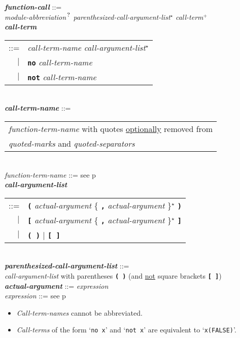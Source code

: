 \documentclass[12pt]{article}
\newcommand{\TT}[1]{{\tt \bfseries #1}}
\newcommand{\ttkey}[1]{{\tt \bfseries #1}}
\newcommand{\emkey}[1]{{\em \bfseries #1}}
\newcommand{\pagref}[1]{p\pageref{#1}}
\newcommand{\STAR}{{\Large $^\star$}}
\newcommand{\PLUS}[1][]{{$^{+#1}$}}
\newcommand{\QMARK}{{$^{\,\mbox{\footnotesize ?}}$}}
\newenvironment{indpar}[1][0.3in]%
	{\begin{list}{}%
		     {\setlength{\itemsep}{0in}%
		      \setlength{\topsep}{0in}%
		      \setlength{\parsep}{1ex}%
		      \setlength{\labelwidth}{#1}%
		      \setlength{\leftmargin}{#1}%
		      \addtolength{\leftmargin}{\labelsep}}%
	 \item}%
	{\end{list}}
\begin{document}
\begin{indpar}
\emkey{function-call}\label{FUNCTION-CALL} ::= \\
\hspace*{0.5in}
        {\em module-abbreviation}\QMARK{}
        {\em parenthesized-call-argument-list}\STAR{}
        {\em call-term}\PLUS{}
\\[0.5ex]
\emkey{call-term}\label{CALL-TERM}
    \begin{tabular}[t]{rl}
    ::= & {\em call-term-name} {\em call-argument-list}\STAR{} \\
    $|$ & \ttkey{no} {\em call-term-name} \\
    $|$ & \ttkey{not} {\em call-term-name} \\
    \end{tabular}
\\[0.5ex]
\emkey{call-term-name}\label{CALL-TERM-NAME} ::=
    \begin{tabular}[t]{@{}l}
    {\em function-term-name} with quotes \underline{optionally} removed from \\
    {\em quoted-marks} and {\em quoted-separators}
    \end{tabular}
\\[0.5ex]
{\em function-term-name} ::= see \pagref{FUNCTION-TERM-NAME}
\\[0.5ex]
\emkey{call-argument-list}\label{CALL-ARGUMENT-LIST}
    \begin{tabular}[t]{rl}
    ::= & \TT{(} {\em actual-argument}
          \{ \TT{,} {\em actual-argument} \}\STAR{} \TT{)} \\
    $|$ & \TT{[} {\em actual-argument}
          \{ \TT{,} {\em actual-argument} \}\STAR{} \TT{]} \\
    $|$ & \TT{(~)} $|$ \TT{[~]} \\
    \end{tabular}
\\[0.5ex]
\emkey{parenthesized-call-argument-list} ::= \\
\hspace*{0.5in}
    {\em call-argument-list} with parentheses \TT{(~)}
    (and \underline{not} square brackets \TT{[~]})
\\[0.5ex]
\emkey{actual-argument} ::= {\em expression}
\\[0.5ex]
{\em expression} ::= see \pagref{EXPRESSION}
\begin{itemize}
\item {\em Call-term-names} cannot be abbreviated.
\item {\em Call-terms} of the form `{\tt no x}' and `{\tt not x}' are
equivalent to `{\tt x(FALSE)}'.
\end{itemize}
\end{indpar}
\end{document}
